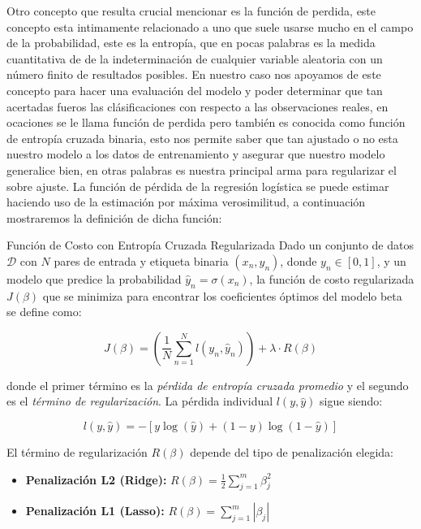 Otro concepto que resulta crucial mencionar es la función de perdida, este concepto esta intimamente relacionado a uno que suele usarse mucho en el campo de la probabilidad, este es la entropía, que en pocas palabras es la medida cuantitativa de de la indeterminación de cualquier variable aleatoria con un número finito de resultados posibles. En nuestro caso nos apoyamos de este concepto para hacer una evaluación del modelo y poder determinar que tan acertadas fueros las clásificaciones con respecto a las observaciones reales, en ocaciones se le llama función de perdida pero también es conocida como función de entropía cruzada binaria, esto nos permite saber que tan ajustado o no esta nuestro modelo a los datos de entrenamiento y asegurar que nuestro modelo generalice bien, en otras palabras es nuestra principal arma para regularizar el sobre ajuste. La función de pérdida de la regresión logística se puede estimar haciendo uso de la estimación por máxima verosimilitud, a continuación mostraremos la definición de dicha función:

\begin{definicion}{Función de Costo con Entropía Cruzada Regularizada}
	Dado un conjunto de datos $\mathcal{D}$ con $N$ pares de entrada y etiqueta binaria $(x_n,y_n)$, donde $y_n\in[0,1]$, y un modelo que predice la probabilidad $\hat{y}_n=\sigma(x_n)$, la función de costo regularizada $J(\beta)$ que se minimiza para encontrar los coeficientes óptimos del modelo 
	beta se define como:
	
	\begin{equation}
		J(\beta) = \left( \frac{1}{N} \sum_{n=1}^{N} l(y_n, \hat{y}_n) \right) + \lambda \cdot R(\beta)
		\label{eq:costo_regularizado}
	\end{equation}
	
	donde el primer término es la \textit{pérdida de entropía cruzada promedio} y el segundo es el \textit{término de regularización}. La pérdida individual $l(y, \hat{y})$ sigue siendo:
	
	\begin{equation}
		l(y, \hat{y}) = -[y \log(\hat{y}) + (1-y)\log(1-\hat{y})]
	\end{equation}
	
	El término de regularización $R(\beta)$ depende del tipo de penalización elegida:
	\begin{itemize}
		\item \textbf{Penalización L2 (Ridge):} $R(\beta) = \frac{1}{2} \sum_{j=1}^{m} \beta_j^2$
		\item \textbf{Penalización L1 (Lasso):} $R(\beta) = \sum_{j=1}^{m} |\beta_j|$
	\end{itemize}
\end{definicion}

